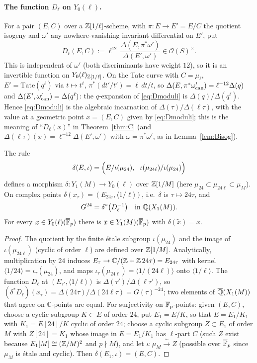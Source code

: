 \paragraph{The function $D_\ell$ on $Y_0(\ell)$.} For a pair $(E,C)$ over a $\mathbb Z[1/\ell]$-scheme, with
$\pi:E\to E'=E/C$ the quotient isogeny and $\omega'$ any nowhere-vanishing invariant differential on
$E'$, put
\begin{equation}\label{eq:Dmoduli}
D_\ell(E,C):=\ell^{12}\,\frac{\Delta(E,\pi^*\omega')}{\Delta(E',\omega')}\in\mathcal O(S)^\times .
\end{equation}
This is independent of $\omega'$ (both discriminants have weight $12$), so it is an invertible
function on $Y_0(\ell)_{\mathbb Z[1/\ell]}$. On the Tate curve with $C=\mu_\ell$, $E'=\mathrm{Tate}(q^\ell)$
via $t\mapsto t^\ell$, $\pi^*(dt'/t')=\ell\,dt/t$, so
$\Delta(E,\pi^*\omega'_{\rm can})=\ell^{-12}\Delta(q)$ and $\Delta(E',\omega'_{\rm can})=\Delta(q^\ell)$:
the $q$-expansion of \eqref{eq:Dmoduli} is $\Delta(q)/\Delta(q^\ell)$. Hence
\eqref{eq:Dmoduli} is the algebraic incarnation of $\Delta(\tau)/\Delta(\ell\tau)$, with the value
at a geometric point $x=(E,C)$ given by \eqref{eq:Dmoduli}; this is the meaning of
``$D_\ell(x)$'' in Theorem~\ref{thm:C} (and $\Delta(\ell\tau)(x)=\ell^{-12}\Delta(E',\omega')$ with
$\omega=\pi^*\omega'$, as in Lemma~\ref{lem:Bisog}).

\begin{lemma}\label{lem:delta}
The rule
\[
\delta(E,\iota)=\Bigl(E/\iota(\mu_{24}),\ \ \iota(\mu_{24\ell})/\iota(\mu_{24})\Bigr)
\]
defines a morphism $\delta:Y_1(M)\to Y_0(\ell)$ over $\mathbb Z[1/M]$ (here $\mu_{24}\subset\mu_{24\ell}\subset\mu_M$).
On complex points $\delta(x_\tau)=(E_{24\tau},\langle 1/\ell\rangle)$, i.e.\ $\delta$ is
$\tau\mapsto24\tau$, and
\[
G^{24}=\delta^*\bigl(D_\ell^{-1}\bigr)\quad\text{in }\mathbb Q(X_1(M)).
\]
For every $x\in Y_0(\ell)(\overline{\mathbb F}_p)$ there is $\tilde x\in Y_1(M)(\overline{\mathbb F}_p)$ with $\delta(\tilde x)=x$.
\end{lemma}
\begin{proof}
The quotient by the finite \'etale subgroup $\iota(\mu_{24})$ and the image of $\iota(\mu_{24\ell})$
(cyclic of order $\ell$) are defined over $\mathbb Z[1/M]$. Analytically, multiplication by $24$ induces
$E_\tau\to\mathbb C/(\mathbb Z+\mathbb Z\,24\tau)=E_{24\tau}$ with kernel $\langle 1/24\rangle=\iota_\tau(\mu_{24})$,
and maps $\iota_\tau(\mu_{24\ell})=\langle1/(24\ell)\rangle$ onto $\langle1/\ell\rangle$. The
function $D_\ell$ at $(E_{\tau'},\langle1/\ell\rangle)$ is $\Delta(\tau')/\Delta(\ell\tau')$, so
$(\delta^*D_\ell)(x_\tau)=\Delta(24\tau)/\Delta(24\ell\tau)=G(\tau)^{-24}$; two elements of
$\overline{\mathbb Q}(X_1(M))$ that agree on $\mathbb C$-points are equal. For surjectivity on $\overline{\mathbb F}_p$-points:
given $(E,C)$, choose a cyclic subgroup $K\subset E$ of order $24$, put $E_1=E/K$, so that
$E=E_1/K_1$ with $K_1=E[24]/K$ cyclic of order $24$; choose a cyclic subgroup $Z\subset E_1$ of order
$M$ with $Z[24]=K_1$ whose image in $E=E_1/K_1$ has $\ell$-part $C$ (such $Z$ exist because
$E_1[M]\cong(\mathbb Z/M)^2$ and $p\nmid M$), and let $\iota:\mu_M\xrightarrow{\ \sim\ }Z$ (possible over
$\overline{\mathbb F}_p$ since $\mu_M$ is \'etale and cyclic). Then $\delta(E_1,\iota)=(E,C)$.
\end{proof}


